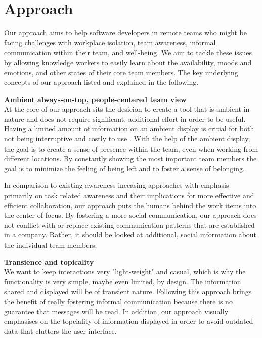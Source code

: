 \chapter{Approach}
\label{chapter:approach}

Our approach aims to help software developers in remote teams who might be facing challenges with workplace isolation, team awareness, informal communication within their team, and well-being. We aim to tackle these issues by allowing knowledge workers to easily learn about the availability, moods and emotions, and other states of their core team members. The key underlying concepts of our approach listed and explained in the following.

\medskip\noindent\textbf{Ambient always-on-top, people-centered team view} \\
At the core of our approach sits the desicion to create a tool that is ambient in nature and does not require significant, additional effort in order to be useful. Having a limited amount of information on an ambient display is critial for both not being interruptive and costly to use \autocite{dabbish2004controlling}. With the help of the ambient display, the goal is to create a sense of presence within the team, even when working from different locations. By constantly showing the most important team members the goal is to minimize the feeling of being left and to foster a sense of belonging.

In comparison to existing awareness inceasing approaches with emphasis primarily on task related awareness and their implications for more effective and efficient collaboration, our approach puts the humans behind the work items into the center of focus. By fostering a more social communication, our approach does not conflict with or replace existing communication patterns that are established in a company. Rather, it should be looked at additional, social information about the individual team members.

\medskip\noindent\textbf{Transience and topicality} \\
We want to keep interactions very "light-weight" and casual, which is why the functionality is very simple, maybe even limited, by design. The information shared and displayed will be of transient nature. Following this approach brings the benefit of really fostering informal communication because there is no guarantee that messages will be read. In addition, our approach visually emphasises on the topciality of information displayed in order to avoid outdated data that clutters the user interface.


